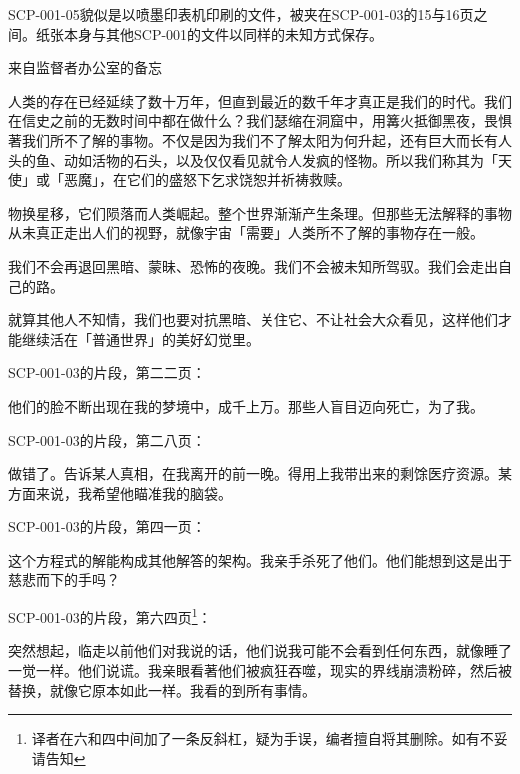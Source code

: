 \documentclass[openany,a4paper]{book} %
\begin{document}
SCP-001-05貌似是以喷墨印表机印刷的文件，被夹在SCP-001-03的15与16页之间。纸张本身与其他SCP-001的文件以同样的未知方式保存。
\begin{colorboxed}
来自监督者办公室的备忘\vspace{12pt}

人类的存在已经延续了数十万年，但直到最近的数千年才真正是我们的时代。我们在信史之前的无数时间中都在做什么？我们瑟缩在洞窟中，用篝火抵御黑夜，畏惧著我们所不了解的事物。不仅是因为我们不了解太阳为何升起，还有巨大而长有人头的鱼、动如活物的石头，以及仅仅看见就令人发疯的怪物。所以我们称其为「天使」或「恶魔」，在它们的盛怒下乞求饶恕并祈祷救赎。\vspace{12pt}

物换星移，它们陨落而人类崛起。整个世界渐渐产生条理。但那些无法解释的事物从未真正走出人们的视野，就像宇宙「需要」人类所不了解的事物存在一般。\vspace{12pt}

我们不会再退回黑暗、蒙昧、恐怖的夜晚。我们不会被未知所驾驭。我们会走出自己的路。\vspace{12pt}

就算其他人不知情，我们也要对抗黑暗、关住它、不让社会大众看见，这样他们才能继续活在「普通世界」的美好幻觉里。
\end{colorboxed}

\vspace{8pt}

SCP-001-03的片段，第二二页：
\begin{colorboxed}
他们的脸不断出现在我的梦境中，成千上万。那些人盲目迈向死亡，为了我。
\end{colorboxed}

\vspace{8pt}

SCP-001-03的片段，第二八页：
\begin{colorboxed}
做错了。告诉某人真相，在我离开的前一晚。得用上我带出来的剩馀医疗资源。某方面来说，我希望他瞄准我的脑袋。
\end{colorboxed}

\vspace{8pt}

SCP-001-03的片段，第四一页：
\begin{colorboxed}
这个方程式的解能构成其他解答的架构。我亲手杀死了他们。他们能想到这是出于慈悲而下的手吗？
\end{colorboxed}

\vspace{8pt}

SCP-001-03的片段，第六四页\footnote{译者在六和四中间加了一条反斜杠，疑为手误，编者擅自将其删除。如有不妥请告知}：
\begin{colorboxed}
突然想起，临走以前他们对我说的话，他们说我可能不会看到任何东西，就像睡了一觉一样。他们说谎。我亲眼看著他们被疯狂吞噬，现实的界线崩溃粉碎，然后被替换，就像它原本如此一样。我看的到所有事情。
\end{colorboxed}
\end{document}
